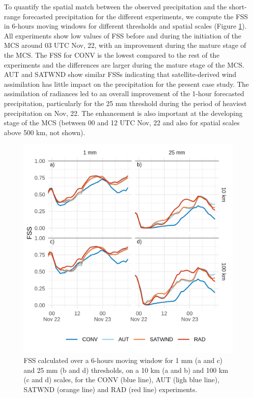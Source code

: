 \documentclass[final,5p,times,twocolumn,authoryear]{elsarticle} %
\begin{document}
To quantify the spatial match between the observed precipitation and the short-range forecasted precipitation for the different experiments, we compute the FSS in 6-hours moving windows for different thresholds and spatial scales (Figure \ref{fig:fss}). All experiments show low values of FSS before and during the initiation of the MCS around 03 UTC Nov, 22, with an improvement during the mature stage of the MCS. The FSS for CONV is the lowest compared to the rest of the experiments and the differences are larger during the mature stage of the MCS. AUT and SATWND show similar FSSs indicating that satellite-derived wind assimilation has little impact on the precipitation for the present case study. The assimilation of radiances led to an overall improvement of the 1-hour forecasted precipitation, particularly for the 25 mm threshold during the period of heaviest precipitation on Nov, 22. The enhancement is also important at the developing stage of the MCS (between 00 and 12 UTC Nov, 22 and also for spatial scales above 500 km, not shown).



\begin{figure}
\centering
\includegraphics{../figures/fss-1.png}
\caption{\label{fig:fss}FSS calculated over a 6-hours moving window for 1 mm (a and c) and 25 mm (b and d) thresholds, on a 10 km (a and b) and 100 km (c and d) scales, for the CONV (blue line), AUT (ligh blue line), SATWND (orange line) and RAD (red line) experiments.}
\end{figure}
\end{document}
